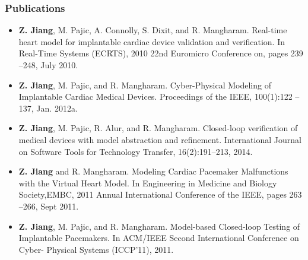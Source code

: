 \documentclass[a4paper]{article}
\begin{document}
\subsubsection{Publications} 
\begin{itemize}
\item \textbf{Z. Jiang}, M. Pajic, A. Connolly, S. Dixit, and R. Mangharam. Real-time heart model
for implantable cardiac device validation and verification. In Real-Time Systems
(ECRTS), 2010 22nd Euromicro Conference on, pages 239 –248, July 2010.
\item \textbf{Z. Jiang}, M. Pajic, and R. Mangharam. Cyber-Physical Modeling of Implantable
Cardiac Medical Devices. Proceedings of the IEEE, 100(1):122 –137, Jan. 2012a.
\item \textbf{Z. Jiang}, M. Pajic, R. Alur, and R. Mangharam. Closed-loop verification of medical
devices with model abstraction and refinement. International Journal on Software
Tools for Technology Transfer, 16(2):191–213, 2014.
\item \textbf{Z. Jiang} and R. Mangharam. Modeling Cardiac Pacemaker Malfunctions with the
Virtual Heart Model. In Engineering in Medicine and Biology Society,EMBC,
2011 Annual International Conference of the IEEE, pages 263 –266, Sept 2011.
\item \textbf{Z. Jiang}, M. Pajic, and R. Mangharam. Model-based Closed-loop Testing of Implantable Pacemakers. In ACM/IEEE Second International Conference on Cyber-
Physical Systems (ICCP’11), 2011.
\end{itemize}



\newpage
\end{document}
